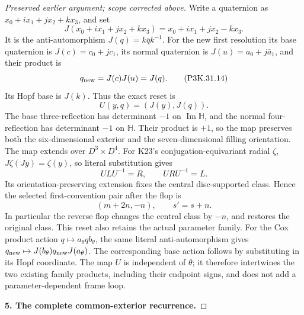 \begin{proof}[Preserved earlier argument; scope corrected above]
Write a quaternion as \(x_0+ix_1+jx_2+kx_3\), and set
\[
 J(x_0+ix_1+jx_2+kx_3)=x_0+ix_1+jx_2-kx_3.
                                                        \tag{P3K.31.13}
\]
It is the anti-automorphism \(J(q)=k\bar q k^{-1}\).
For the new first resolution its base quaternion is
\(J(c)=c_0+jc_1\), its normal quaternion is
\(J(u)=a_0+j\bar a_1\), and their product is
\[
                      q_{\rm new}=J(c)J(u)=J(q).
                                                        \tag{P3K.31.14}
\]
Its Hopf base is \(J(k)\). Thus the exact reset is
\[
                       U(y,q)=(J(y),J(q)).
                                                        \tag{P3K.31.15}
\]
The base three-reflection has determinant \(-1\) on
\(\operatorname{Im}\mathbb H\), and the normal
four-reflection has determinant \(-1\) on
\(\mathbb H\). Their product is \(+1\), so the map
preserves both the six-dimensional exterior and
the seven-dimensional filling orientation.
The map extends over \(D^3\times D^4\).
For K23's conjugation-equivariant radial \(\zeta\),
\(J\zeta(Jy)=\zeta(y)\), so literal substitution gives
\[
                    ULU^{-1}=R,\qquad URU^{-1}=L.
                                                        \tag{P3K.31.16}
\]
Its orientation-preserving extension fixes the central
disc-supported class. Hence the selected first-convention
pair after the flop is
\[
                        (m+2n,-n),\qquad s'=s+n.
                                                        \tag{P3K.31.17}
\]
In particular the reverse flop changes the central class
by \(-n\), and restores the original class.
This reset also retains the actual parameter family.
For the Cox product action \(q\mapsto a_\theta q b_\theta\),
the same literal anti-automorphism gives
\(q_{\rm new}\mapsto J(b_\theta)q_{\rm new}J(a_\theta)\).
The corresponding base action follows by substituting
in its Hopf coordinate. The map \(U\) is independent of
\(\theta\); it therefore intertwines the two existing
family products, including their endpoint signs, and
does not add a parameter-dependent frame loop.

\par\medskip\noindent\textbf{5. The complete common-exterior recurrence.}\enspace


\end{proof}
